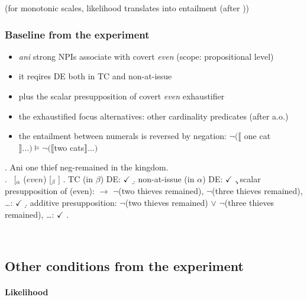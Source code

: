 \documentclass[
  letterpaper,
  DIV=11,
  numbers=noendperiod]{scrartcl}
\let\oldparagraph\paragraph
\renewcommand{\paragraph}[1]{\oldparagraph{#1}\mbox{}}
\providecommand{\tightlist}{%
  \setlength{\itemsep}{0pt}\setlength{\parskip}{0pt}}\usepackage{longtable,booktabs,array}
\begin{document}
\footnotesize(for monotonic scales, likelihood translates into
entailment (after \cite{crnic2011getting}))\normalsize

\hypertarget{baseline-from-the-experiment}{%
\subsubsection{Baseline from the
experiment}\label{baseline-from-the-experiment}}

\begin{itemize}
\tightlist
\item
  \emph{ani} strong NPIs associate with covert \emph{even} (scope:
  propositional level)
\item
  it reqires DE both in TC and non-at-issue
\item
  plus the scalar presupposition of covert \emph{even} exhaustifier
\item
  the exhaustified focus alternatives: other cardinality predicates
  (after \cite{lahiri1998focus,crnic2011getting} a.o.)
\item
  the entailment between numerals is reversed by negation:
  \(\neg (\llbracket\) one cat
  \(\rrbracket \ldots) \models \neg(\llbracket\)two
  cats\(\rrbracket \ldots)\)
\end{itemize}

\ex. Ani one thief neg-remained in the kingdom.\\
\a. ~{[}\(_\alpha\) (\(even\)) {[}\(_\beta\)
\neg [$_\gamma$ ani one thief remained in the kingdom ]{]} {]} \a. TC
(in \(\beta\)) DE: \(\checkmark\) \b. non-at-issue (in \(\alpha\)) DE:
\(\checkmark\) \c. scalar presupposition of (even): \(\rightarrow\)
\(\neg\)(two thieves remained), \(\neg\)(three thieves remained),
\ldots: \(\checkmark\) \d. additive presupposition: \(\neg\)(two thieves
remained) \(\vee\) \(\neg\)(three thieves remained), \ldots:
\(\checkmark\) \z.

~

\hypertarget{other-conditions-from-the-experiment}{%
\subsection{Other conditions from the
experiment}\label{other-conditions-from-the-experiment}}

\hypertarget{likelihood}{%
\paragraph{Likelihood}\label{likelihood}}
\end{document}
